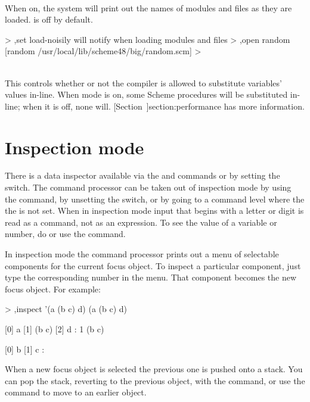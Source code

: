\begin{description}
\item {}\\
    When on, the system will print out the names of modules and files
    as they are loaded.   is off by default.
\begin{example}
> ,set load-noisily
will notify when loading modules and files
> ,open random
[random /usr/local/lib/scheme48/big/random.scm]
> 
\end{example}

\item {}\\
This controls whether or not the compiler is allowed to substitute
 variables' values in-line.
When  mode is on,
some Scheme procedures will be substituted in-line; when it is off,
none will.
[Section~\Ref]{section:performance}
has more information.

\end{description}

\section{Inspection mode}
\label{inspector}

There is a data inspector available via the  and
  commands or by setting the  switch.
The command processor can be taken out of inspection mode by
 using the  command, by unsetting the  switch,
 or by going to a command level where the the  is not
 set.
When in inspection mode input that begins with
  a letter or digit is read as a command, not as an expression.
To see the value of a variable or number, do 
  or use the  command.

In inspection mode the command processor prints out a
 menu of selectable components for the current focus object.
To inspect a particular component, just type the corresponding number in
 the menu.
That component becomes the new focus object.
For example:
\begin{example}
> ,inspect '(a (b c) d)
(a (b c) d)

[0] a
[1] (b c)
[2] d
: 1
(b c)

[0] b
[1] c
: 
\end{example}

When a new focus object is selected the previous one is pushed onto a
 stack.
You can pop the stack, reverting to the previous object, with
 the  command, or use the  command to move to
 an earlier object.

